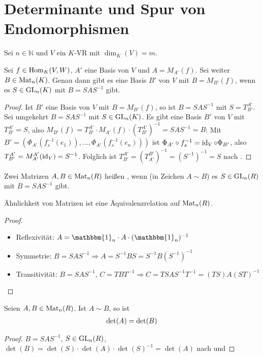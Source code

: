 \section{Determinante und Spur von Endomorphismen}

Sei $n\in \mathbb N$ und $V$ ein $K$-VR mit $\dim_K(V)=m$.

\begin{proposition}
	Sei $f\in \operatorname{Hom}_K(V,W)$, $A'$ eine Basis von $V$ und $A=M_{A'}(f)$. Sei weiter $B\in \operatorname{Mat}_n(K)$. Genau 
	dann gibt es eine Basis $B'$ von $V$ mit $B=M_{B'}(f)$, wenn es $S\in \operatorname{GL}_n(K)$ mit $B=SAS^{-1}$ gibt.
\end{proposition}
\begin{proof}
	Ist $B'$ eine Basis von $V$ mit $B=M_{B'}(f)$, so ist $B=SAS^{-1}$ mit $S=T^{A'}_{B'}$. Sei umgekehrt $B=SAS^{-1}$ mit 
	$S\in \operatorname{GL}_n(K)$. Es gibt eine Basis $B'$ von $V$ mit $T^{A'}_{B'}=S$, also $M_{B'}(f)=T^{A'}_{B'}\cdot M_{A'}(f)\cdot (
	T^{A'}_{B'})^{-1}=SAS^{-1}=B$: Mit $B'=(\Phi_{A'}(f_s^{-1}(e_1)),...,\Phi_{A'}(f_s^{-1}(e_n)))$ ist $\Phi_{A'}\circ f_s^{-1}=
	\operatorname{id}_V\circ \Phi_{B'}$, also $T^{A'}_{B'}=M_{A'}^{A'}(\operatorname{id}_V)=S^{-1}$. Folglich ist $T^{A'}_{B'}=(T_{A'}^{B'})^{-1}=(S^{-1})^{-1}
	=S$ nach .
\end{proof}

\begin{definition}[Ähnlichkeit]
	Zwei Matrizen $A,B\in \operatorname{Mat}_n(R)$ heißen , wenn (in Zeichen $A\sim B$) es 
	$S\in \operatorname{GL}_n(R)$ mit $B=SAS^{-1}$ gibt.
\end{definition}

\begin{proposition}
	Ähnlichkeit von Matrizen ist eine Äquivalenzrelation auf $\operatorname{Mat}_n(R)$.
\end{proposition}
\begin{proof}
	\begin{itemize}
		\item Reflexivität: $A=\mathbbm{1}_n\cdot A \cdot (\mathbbm{1}_n)^{-1}$
		\item Symmetrie: $B=SAS^{-1}\Rightarrow A=S^{-1}BS=S^{-1}B(S^{-1})^{-1}$
		\item Transitivität: $B=SAS^{-1}$, $C=TBT^{-1}\Rightarrow C=TSAS^{-1}T^{-1}=(TS)A(ST)^{-1}$
	\end{itemize}
\end{proof}

\begin{proposition}
	Seien $A,B\in \operatorname{Mat}_n(R)$. Ist $A\sim B$, so ist
	\begin{align}
		\det(A)=\det(B)\notag
	\end{align}
\end{proposition}
\begin{proof}
	$B=SAS^{-1}$, $S\in \operatorname{GL}_n(R)$, $\det(B)=\det(S)\cdot \det(A)\cdot \det(S)^{-1}=\det(A)$ nach  und 
\end{proof}

